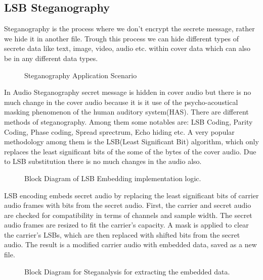 \documentclass{article}
\begin{document}
\subsection{LSB Steganography}
\label{sec:steganography}
Steganography is the process where we don't encrypt the secrete message, rather we hide it in another file. Trough this process we can hide different types of secrete data like text, image, video, audio etc. within cover data which can also be in any different data types.\cite{jayaram2011information}\cite{hemeida2021comparative}
\begin{figure}[!h]
    \begin{center}
        
        \caption{Steganography Application Scenario}
        \label{fig:stegoApplication}
    \end{center}
\end{figure}

In Audio Steganography secret message is hidden in cover audio but there is no much change in the cover audio because it is it use of the psycho-acoustical masking phenomenon of the human auditory system(HAS). There are different methods of steganography. Among them some notables are: LSB Coding, Parity Coding, Phase coding, Spread sprectrum, Echo hiding etc.\cite{hemeida2021comparative} A very popular methodology among them is the LSB(Least Significant Bit) algorithm, which only replaces the least significant bits of the some of the bytes of the cover audio. Due to LSB substitution there is no much changes in the audio also.
\begin{figure}[!h]
    \begin{center}
        
        \caption{Block Diagram of LSB Embedding implementation logic.}
        \label{fig:stegoEmbed}
    \end{center}
\end{figure}

LSB encoding embeds secret audio by replacing the least significant bits of carrier audio frames with bits from the secret audio. First, the carrier and secret audio are checked for compatibility in terms of channels and sample width. The secret audio frames are resized to fit the carrier’s capacity. A mask is applied to clear the carrier’s LSBs, which are then replaced with shifted bits from the secret audio. The result is a modified carrier audio with embedded data, saved as a new file.
\begin{figure}[!h]
    \begin{center}
        
        \caption{Block Diagram for Steganalysis for extracting the embedded data.}
        \label{fig:stegoExtract}
    \end{center}
\end{figure}
\end{document}
